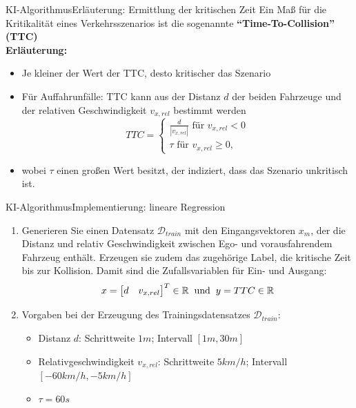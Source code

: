 \documentclass[169, handout	]{THIbeamer} %
\begin{document}
	\begin{frame}{KI-Algorithmus}{Erläuterung: Ermittlung der kritischen Zeit}
		Ein Maß für die Kritikalität eines Verkehrsszenarios ist die sogenannte \textbf{\enquote{Time-To-Collision} (TTC)} \\ 
		\textbf{Erläuterung:}
		\begin{itemize}
			\item Je kleiner der Wert der TTC, desto kritischer das Szenario
			\item Für Auffahrunfälle: TTC kann aus der Distanz $d$ der beiden Fahrzeuge und der relativen Geschwindigkeit $v_{x,rel}$ bestimmt werden
			\begin{equation}
				TTC = 
				\begin{cases}
					\frac{d}{|v_{x,rel}|} \text{ für } v_{x,rel}<0 \\
					\tau \text{ für } v_{x,rel} \geq 0 \text{,}
				\end{cases}
			\end{equation}
			\item[] wobei $\tau$ einen großen Wert besitzt, der indiziert, dass das Szenario unkritisch ist.
		\end{itemize}			
	\end{frame}
	\begin{frame}{KI-Algorithmus}{Implementierung: lineare Regression}
		\begin{enumerate}
			\item Generieren Sie einen Datensatz $\mathcal{D}_{train}$ mit den Eingangsvektoren $x_m$, der die Distanz und relativ Geschwindigkeit zwischen Ego- und vorausfahrendem Fahrzeug enthält. Erzeugen sie zudem das zugehörige Label, die kritische Zeit bis zur Kollision. Damit sind die Zufallsvariablen für Ein- und Ausgang:
		\begin{equation}
			x = 			
			\begin{bmatrix}
				d & v_{x,rel}
			\end{bmatrix}
			^T \in \mathbb{R} 
			\hspace{0.2 cm}
			\text{und}
			\hspace{0.2 cm}			
			y = TTC \in \mathbb{R}
		\end{equation}
			\item[] Vorgaben bei der Erzeugung des Trainingsdatensatzes $\mathcal{D}_{train}$:
			\begin{itemize}
				\item Distanz $d$: Schrittweite $1m$; Intervall $[1m, 30m]$ 
				\item Relativgeschwindigkeit $v_{x,rel}$: Schrittweite $5 km/h$; Intervall $[-60 km/h, -5 km/h]$
				\item $\tau = 60s$
			\end{itemize}			 
		\end{enumerate}
	\end{frame}
\end{document}
